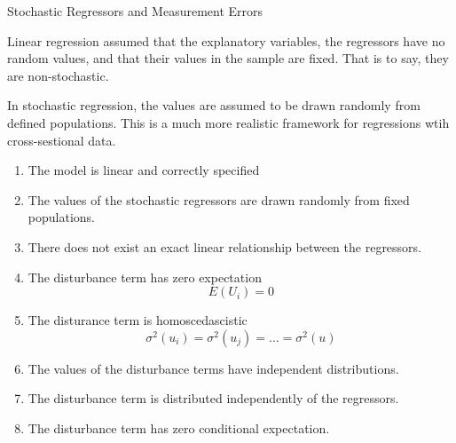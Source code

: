 Stochastic Regressors and Measurement Errors

Linear regression assumed that the explanatory variables, the regressors have no random values, and that their values in the sample are fixed. 
That is to say, they are non-stochastic.

In stochastic regression, the values are assumed to be drawn randomly from defined populations. This is a
much more realistic framework for regressions wtih cross-sestional data.

\begin{enumerate}
\item The model is linear and correctly specified
\item The values of the stochastic regressors are drawn randomly from fixed populations.
\item There does not exist an exact linear relationship between the regressors.
\item The disturbance term has zero expectation 
\[ E(U_i)=0\]
\item The disturance term is homoscedascistic
\[ \sigma^2(u_i) = \sigma^2(u_j) = \ldots= \sigma^2(u)\]
\item The values of the disturbance terms have independent distributions.

\item The disturbance term is distributed independently of the regressors.
\item The disturbance term has zero conditional expectation.

\end{enumerate}

